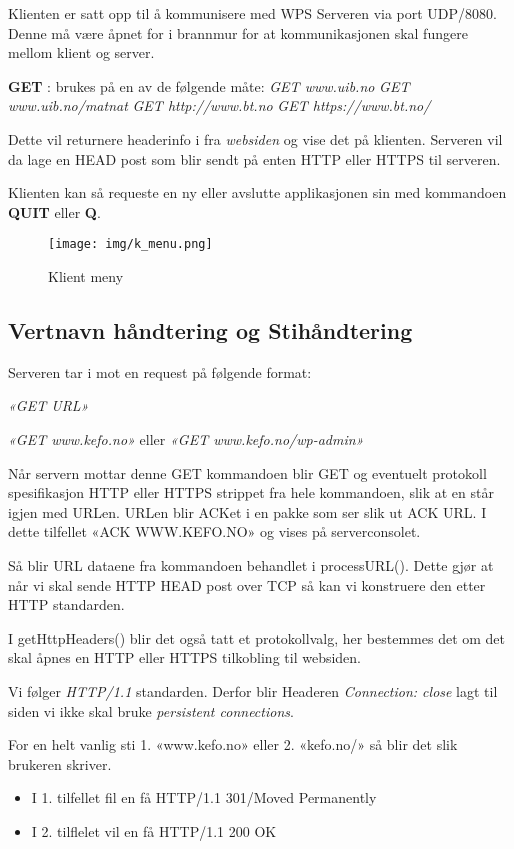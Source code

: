 \documentclass[norsk,a4paper]{article}
\begin{document}
Klienten er satt opp til å kommunisere med WPS Serveren via port UDP/8080.
Denne må være åpnet for i brannmur for at kommunikasjonen skal fungere mellom klient og server.

\textbf{GET} : brukes på en av de følgende måte:
\textit{GET www.uib.no}
\textit{GET www.uib.no/matnat}
\textit{GET http://www.bt.no}
\textit{GET https://www.bt.no/}

Dette vil returnere headerinfo i fra \textit{websiden} og vise det på klienten. Serveren vil da lage en HEAD post som blir sendt på enten HTTP eller HTTPS til serveren.

Klienten kan så requeste en ny eller avslutte applikasjonen sin med kommandoen \textbf{QUIT} eller \textbf{Q}.

\begin{figure}[ht!]
  \texttt{[image: img/k\_menu.png]}
  \caption{Klient meny}
  \label{fig:klient_meny}
\end{figure}

\clearpage

\subsection{Vertnavn håndtering og Stihåndtering}
Serveren tar i mot en request på følgende format:

\textit{«GET URL»}

\textit{«GET www.kefo.no»} eller \textit{«GET www.kefo.no/wp-admin»}

Når servern mottar denne GET kommandoen blir GET og eventuelt protokoll spesifikasjon HTTP eller HTTPS strippet fra hele kommandoen, slik at en står igjen med URLen.
URLen blir ACKet i en pakke som ser slik ut ACK URL.
I dette tilfellet «ACK WWW.KEFO.NO» og vises på serverconsolet.

Så blir URL dataene fra kommandoen behandlet i processURL().
Dette gjør at når vi skal sende HTTP HEAD post over TCP så kan vi konstruere den etter HTTP standarden.

I getHttpHeaders() blir det også tatt et protokollvalg,
her bestemmes det om det skal åpnes en HTTP eller HTTPS tilkobling til websiden.

Vi følger \textit{HTTP/1.1} standarden.
Derfor blir Headeren \textit{Connection: close} lagt til siden vi ikke skal bruke \textit{persistent connections}.

For en helt vanlig sti 1. «www.kefo.no» eller 2. «kefo.no/» så blir det slik brukeren skriver.
\begin{itemize}
  \item I 1. tilfellet fil en få HTTP/1.1 301/Moved Permanently
  \item I 2. tilflelet vil en få HTTP/1.1 200 OK
\end{itemize}
\end{document}
